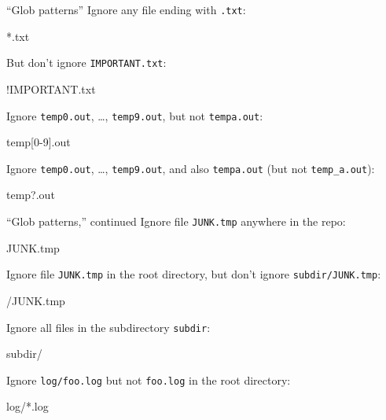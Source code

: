 \begin{frame}[fragile]{``Glob patterns''}
  Ignore any file ending with \texttt{.txt}:

  \begin{gitCommand}*.txt\end{gitCommand}

  But don't ignore \texttt{IMPORTANT.txt}:

  \begin{gitCommand}!IMPORTANT.txt\end{gitCommand}

  Ignore \texttt{temp0.out}, \ldots, \texttt{temp9.out}, but not
  \texttt{tempa.out}:

  \begin{gitCommand}temp[0-9].out\end{gitCommand}

  Ignore \texttt{temp0.out}, \ldots, \texttt{temp9.out}, and also
  \texttt{tempa.out} (but not \texttt{temp\_a.out}):

  \begin{gitCommand}temp?.out\end{gitCommand}
\end{frame}

\begin{frame}[fragile]{``Glob patterns,'' continued}
  Ignore file \texttt{JUNK.tmp} anywhere in the repo:

  \begin{gitCommand}JUNK.tmp\end{gitCommand}

  Ignore file \texttt{JUNK.tmp} in the root directory, but don't ignore
  \texttt{subdir/JUNK.tmp}:

  \begin{gitCommand}/JUNK.tmp\end{gitCommand}

  Ignore all files in the subdirectory \texttt{subdir}:

  \begin{gitCommand}subdir/\end{gitCommand}

  Ignore \texttt{log/foo.log} but not \texttt{foo.log} in the root directory:

  \begin{gitCommand}log/*.log\end{gitCommand}
\end{frame}


